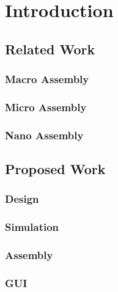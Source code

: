 \let\cleardoublepage\clearpage
\chapter{Introduction}

\section{Related Work}

\subsection{Macro Assembly}

\subsection{Micro Assembly}

\subsection{Nano Assembly}

\section{Proposed Work}

\subsection{Design}

\subsection{Simulation}

\subsection{Assembly}

\subsection{GUI}

